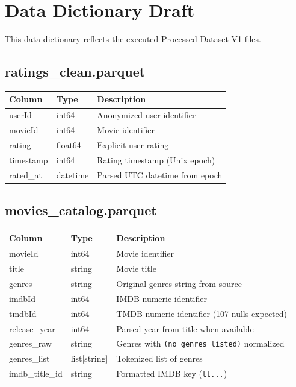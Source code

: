 \documentclass[11pt]{article}
\begin{document}
\section{Data Dictionary Draft}

This data dictionary reflects the executed Processed Dataset V1 files.

\subsection{ratings\_clean.parquet}

\begin{longtable}{@{}p{}p{}p{}@{}}
\toprule
\textbf{Column} & \textbf{Type} & \textbf{Description} \\
\midrule
\endhead
userId & int64 & Anonymized user identifier \\
movieId & int64 & Movie identifier \\
rating & float64 & Explicit user rating \\
timestamp & int64 & Rating timestamp (Unix epoch) \\
rated\_at & datetime & Parsed UTC datetime from epoch \\
\bottomrule
\end{longtable}

\subsection{movies\_catalog.parquet}

\begin{longtable}{@{}p{}p{}p{}@{}}
\toprule
\textbf{Column} & \textbf{Type} & \textbf{Description} \\
\midrule
\endhead
movieId & int64 & Movie identifier \\
title & string & Movie title \\
genres & string & Original genres string from source \\
imdbId & int64 & IMDB numeric identifier \\
tmdbId & int64 & TMDB numeric identifier (107 nulls expected) \\
release\_year & int64 & Parsed year from title when available \\
genres\_raw & string & Genres with \texttt{(no genres listed)} normalized \\
genres\_list & list[string] & Tokenized list of genres \\
imdb\_title\_id & string & Formatted IMDB key (\texttt{tt...}) \\
\bottomrule
\end{longtable}
\end{document}

